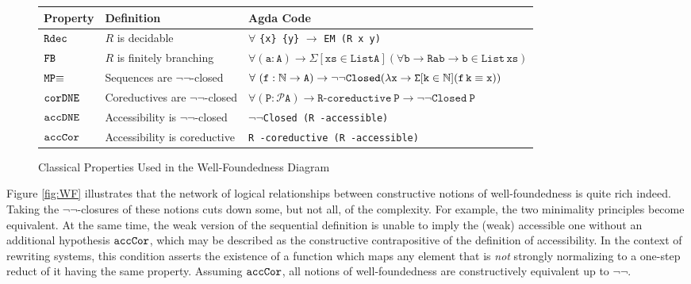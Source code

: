 
{
\def\arraystretch{1.3}
\begin{figure}[h!]
\small
\begin{tabular}{@{}l l l @{}}
\toprule
\textbf{Property} & \textbf{Definition}  &\textbf{Agda Code}  \\
\midrule
$\mathtt{Rdec}$   & $R$ is decidable
          & $\forall$ \verb|{x} {y}| $\to$ \verb|EM (R x y)|\\
$\mathtt{FB}$     & $R$ is finitely branching
          & $\mathtt{\forall (a : A) \to \Sigma [ xs \in List A ] (\forall b \to R a b \to b \in{}List\, xs)}$ \\
$\mathtt{MP}{\equiv}$    & Sequences are $\lnot\lnot$-closed
          & $\forall\ \mathtt{(f : \nat \to A) \to \lnot\lnot Closed
          (\lambda x \to \Sigma [ k \in \nat ] (f\, k \equiv x))}$ \\
$\mathtt{corDNE}$ & Coreductives are $\lnot\lnot$-closed
          & $\mathtt{\forall (P : \mathcal{P} A) \to R}$-$\mathtt{coreductive\ P \to \lnot\lnot Closed\ P}$\\
$\mathtt{accDNE}$ & Accessibility is $\lnot\lnot$-closed
          & $\lnot\lnot$\verb|Closed (R -accessible)| \\
$\mathtt{accCor}$ & Accessibility is coreductive
          & \verb|R -coreductive (R -accessible)| \\
\bottomrule
\end{tabular}
\centering
\caption{Classical Properties Used in the Well-Foundedness Diagram}
\label{tab:cprop}
\end{figure}
}

Figure \ref{fig:WF} illustrates that the network of logical relationships between
constructive notions of well-foundedness is quite rich indeed.
Taking the $\lnot\lnot$-closures of
these notions cuts down some, but not all, of the complexity.
For example, the two minimality principles become equivalent.
At the same time, the weak version of the sequential definition is unable to imply
the (weak) accessible one without an additional hypothesis $\mathtt{accCor}$,
which may be described as the constructive contrapositive of the definition of accessibility.
In the context of rewriting systems,
this condition asserts the existence of a function which maps any
element that is \emph{not} strongly normalizing to a one-step reduct of it having the same property.
Assuming $\mathtt{accCor}$, all notions of well-foundedness
are constructively equivalent up to $\lnot\lnot$.

